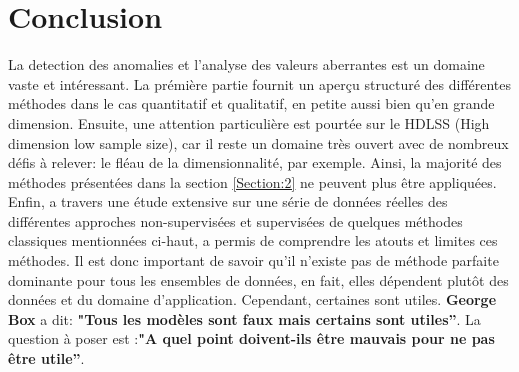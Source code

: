 
\section{Conclusion}
La detection des anomalies et l'analyse  des valeurs aberrantes est un domaine vaste et intéressant. La prémière partie fournit un aperçu structuré des différentes méthodes dans le cas quantitatif et qualitatif, en petite aussi bien qu'en grande dimension. Ensuite, une attention particulière est pourtée sur le HDLSS (High dimension low
sample size), car il reste un domaine très ouvert avec de nombreux défis à relever: le fléau de la dimensionnalité, par exemple. Ainsi, la majorité des méthodes présentées dans la section \ref{Section:2} ne peuvent plus être appliquées. 
Enfin, a travers une étude extensive sur une série de données réelles des différentes approches non-supervisées  et supervisées de quelques méthodes classiques  mentionnées ci-haut, a permis de comprendre les atouts et limites ces méthodes.  Il est  donc important de savoir qu'il n'existe pas de méthode parfaite dominante pour tous les ensembles de données, en fait, elles dépendent plutôt des données et du domaine d'application. Cependant, certaines sont utiles. \textbf{George Box} a dit: \textbf{"Tous les modèles sont faux mais certains sont utiles”}. La question à poser est :\textbf{"A quel point doivent-ils être mauvais pour ne pas être utile”}.
\afterpage{\FloatBarrier}

